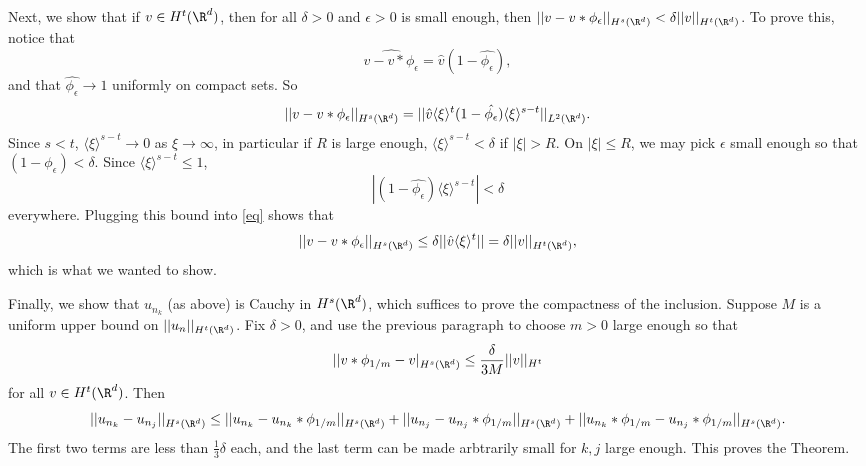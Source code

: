 \documentclass[12pt]{article}
\begin{document}
Next, we show that if $v \in H^t(\R^d)$, then for all $\delta > 0$ and $\epsilon > 0$ is small enough, then $||v-v\ast\phi_\epsilon||_{H^s(\R^d)} < \delta||v||_{H^t(\R^d)}$. To prove this, notice that \[\widehat{v-v\ast\phi_\epsilon} = \hat{v}(1-\hat{\phi_\epsilon}),\] and that $\hat{\phi_\epsilon} \to 1$ uniformly on compact sets. So
\begin{equation}\label{eq}||v-v\ast\phi_\epsilon||_{H^s(\R^d)} = ||\hat{v}\langle \xi \rangle^{t}(1-\hat{\phi_\epsilon})\langle \xi \rangle^{s-t}||_{L^2(\R^d)}.\end{equation} Since $s < t$, $\langle \xi \rangle^{s-t} \to 0$ as $\xi \to \infty$, in particular if $R$ is large enough, $\langle \xi \rangle^{s-t} < \delta$ if $|\xi| > R$. On $|\xi| \leq R$, we may pick $\epsilon$ small enough so that $(1-\phi_\epsilon) < \delta$. Since $\langle \xi \rangle^{s-t} \leq 1$,
\[|(1-\hat{\phi_\epsilon})\langle \xi \rangle^{s-t}| < \delta\] everywhere. Plugging this bound into \eqref{eq} shows that
\[||v-v\ast\phi_\epsilon||_{H^s(\R^d)} \leq \delta||\hat{v}\langle \xi \rangle^{t}|| = \delta||v||_{H^t(\R^d)},\] which is what we wanted to show. 

Finally, we show that $u_{n_k}$ (as above) is Cauchy in $H^s(\R^d)$, which suffices to prove the compactness of the inclusion. Suppose $M$ is a uniform upper bound on $||u_n||_{H^t(\R^d)}$. Fix $\delta > 0$, and use the previous paragraph to choose $m > 0$ large enough so that
\[||v \ast \phi_{1/m}-v|_{H^s(\R^d)} \leq \frac{\delta}{3M}||v||_{H^t}\]
for all $v \in H^t(\R^d)$. Then
\[||u_{n_k}-u_{n_j}||_{H^s(\R^d)} \leq ||u_{n_k}-u_{n_k}\ast\phi_{1/m}||_{H^s(\R^d)} + ||u_{n_j}-u_{n_j}\ast\phi_{1/m}||_{H^s(\R^d)} + ||u_{n_k}\ast\phi_{1/m}-u_{n_j}\ast\phi_{1/m}||_{H^s(\R^d)}.\]
The first two terms are less than $\frac{1}{3}\delta$ each, and the last term can be made arbtrarily small for $k,j$ large enough. This proves the Theorem.
\end{document}

